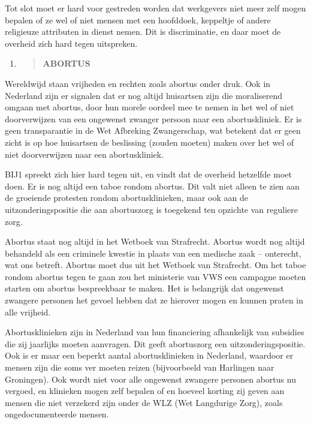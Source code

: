 Tot slot moet er hard voor gestreden worden dat werkgevers niet meer
zelf mogen bepalen of ze wel of niet mensen met een hoofddoek, keppeltje
of andere religieuze attributen in dienst nemen. Dit is discriminatie,
en daar moet de overheid zich hard tegen uitspreken.

\begin{enumerate}
\def\labelenumi{\arabic{enumi}.}
\setcounter{enumi}{13}
\item
  \begin{quote}
  \textbf{ABORTUS}
  \end{quote}
\end{enumerate}

Wereldwijd staan vrijheden en rechten zoals abortus onder druk. Ook in
Nederland zijn er signalen dat er nog altijd huisartsen zijn die
moraliserend omgaan met abortus, door hun morele oordeel mee te nemen in
het wel of niet doorverwijzen van een ongewenst zwanger persoon naar een
abortuskliniek. Er is geen transparantie in de Wet Afbreking
Zwangerschap, wat betekent dat er geen zicht is op hoe huisartsen de
beslissing (zouden moeten) maken over het wel of niet doorverwijzen naar
een abortuskliniek.

BIJ1 spreekt zich hier hard tegen uit, en vindt dat de overheid
hetzelfde moet doen. Er is nog altijd een taboe rondom abortus. Dit valt
niet alleen te zien aan de groeiende protesten rondom abortusklinieken,
maar ook aan de uitzonderingspositie die aan abortuszorg is toegekend
ten opzichte van reguliere zorg.

Abortus staat nog altijd in het Wetboek van Strafrecht. Abortus wordt
nog altijd behandeld als een criminele kwestie in plaats van een
medische zaak -- onterecht, wat ons betreft. Abortus moet dus uit het
Wetboek van Strafrecht. Om het taboe rondom abortus tegen te gaan zou
het ministerie van VWS een campagne moeten starten om abortus
bespreekbaar te maken. Het is belangrijk dat ongewenst zwangere personen
het gevoel hebben dat ze hierover mogen en kunnen praten in alle
vrijheid.

Abortusklinieken zijn in Nederland van hun financiering afhankelijk van
subsidies die zij jaarlijks moeten aanvragen. Dit geeft abortuszorg een
uitzonderingspositie. Ook is er maar een beperkt aantal abortusklinieken
in Nederland, waardoor er mensen zijn die soms ver moeten reizen
(bijvoorbeeld van Harlingen naar Groningen). Ook wordt niet voor alle
ongewenst zwangere personen abortus nu vergoed, en klinieken mogen zelf
bepalen of en hoeveel korting zij geven aan mensen die niet verzekerd
zijn onder de WLZ (Wet Langdurige Zorg), zoals ongedocumenteerde mensen.

